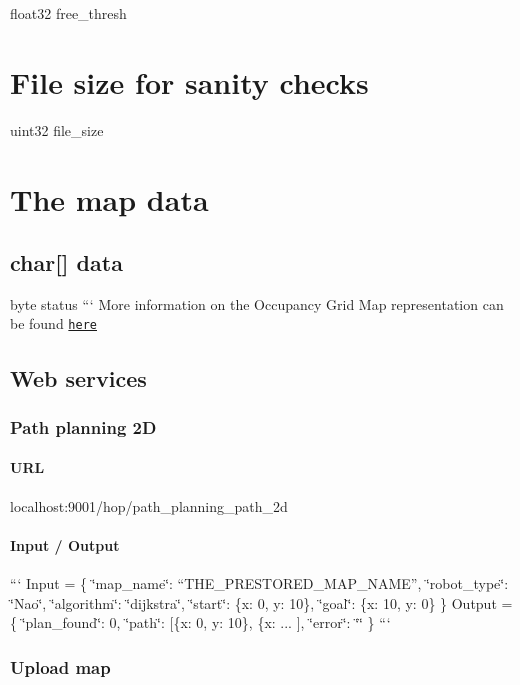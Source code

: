 float32 free\-\_\-thresh \section*{File size for sanity checks}

uint32 file\-\_\-size \section*{The map data}

\subsection*{char\mbox{[}\mbox{]} data }

byte status ``` More information on the Occupancy Grid Map representation can be found \href{http://docs.ros.org/jade/api/nav_msgs/html/msg/OccupancyGrid.html}{\tt here}

\subsection*{Web services}

\subsubsection*{Path planning 2\-D}

\paragraph*{U\-R\-L}

{\ttfamily localhost\-:9001/hop/path\-\_\-planning\-\_\-path\-\_\-2d}

\paragraph*{Input / Output}

``` Input = \{ \char`\"{}map\-\_\-name\char`\"{}\-: “\-T\-H\-E\-\_\-\-P\-R\-E\-S\-T\-O\-R\-E\-D\-\_\-\-M\-A\-P\-\_\-\-N\-A\-M\-E”, \char`\"{}robot\-\_\-type\char`\"{}\-: \char`\"{}\-Nao\char`\"{}, \char`\"{}algorithm\char`\"{}\-: \char`\"{}dijkstra\char`\"{}, \char`\"{}start\char`\"{}\-: \{x\-: 0, y\-: 10\}, \char`\"{}goal\char`\"{}\-: \{x\-: 10, y\-: 0\} \} {\ttfamily  } Output = \{ \char`\"{}plan\-\_\-found\char`\"{}\-: 0, \char`\"{}path\char`\"{}\-: \mbox{[}\{x\-: 0, y\-: 10\}, \{x\-: ... \mbox{]}, \char`\"{}error\char`\"{}\-: \char`\"{}\char`\"{} \} ```

\subsubsection*{Upload map}

